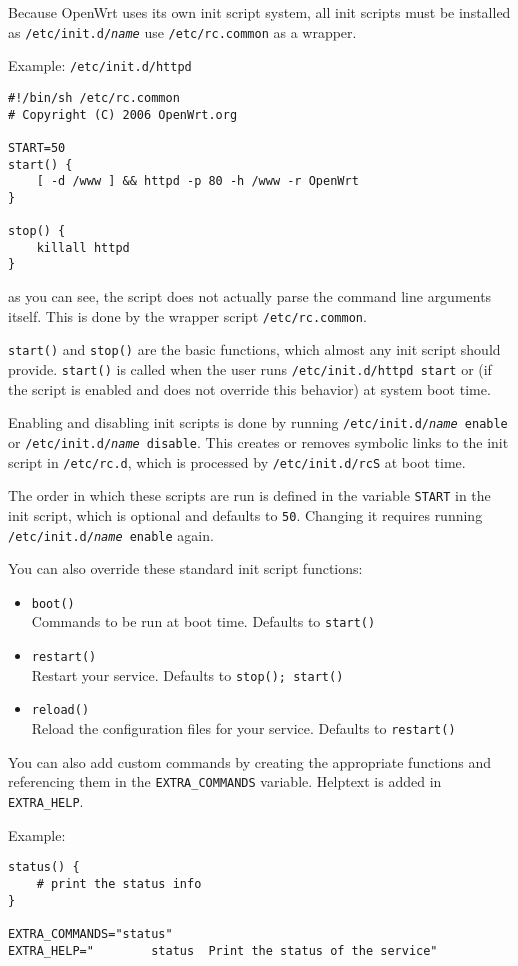 Because OpenWrt uses its own init script system, all init scripts must be installed
as \texttt{/etc/init.d/\textit{name}} use \texttt{/etc/rc.common} as a wrapper.

Example: \texttt{/etc/init.d/httpd}

\begin{Verbatim}
#!/bin/sh /etc/rc.common
# Copyright (C) 2006 OpenWrt.org

START=50
start() {
    [ -d /www ] && httpd -p 80 -h /www -r OpenWrt
}

stop() {
    killall httpd
}
\end{Verbatim}

as you can see, the script does not actually parse the command line arguments itself.
This is done by the wrapper script \texttt{/etc/rc.common}.

\texttt{start()} and \texttt{stop()} are the basic functions, which almost any init
script should provide. \texttt{start()} is called when the user runs \texttt{/etc/init.d/httpd start}
or (if the script is enabled and does not override this behavior) at system boot time.

Enabling and disabling init scripts is done by running \texttt{/etc/init.d/\textit{name} enable}
or \texttt{/etc/init.d/\textit{name} disable}. This creates or removes symbolic links to the
init script in \texttt{/etc/rc.d}, which is processed by \texttt{/etc/init.d/rcS} at boot time.

The order in which these scripts are run is defined in the variable \texttt{START} in the init
script, which is optional and defaults to \texttt{50}. Changing it requires running
\texttt{/etc/init.d/\textit{name} enable} again.

You can also override these standard init script functions:
\begin{itemize}
    \item \texttt{boot()} \\
        Commands to be run at boot time. Defaults to \texttt{start()}

    \item \texttt{restart()} \\
        Restart your service. Defaults to \texttt{stop(); start()}

    \item \texttt{reload()} \\
        Reload the configuration files for your service. Defaults to \texttt{restart()}

\end{itemize}

You can also add custom commands by creating the appropriate functions and referencing them
in the \texttt{EXTRA\_COMMANDS} variable. Helptext is added in \texttt{EXTRA\_HELP}.

Example:

\begin{Verbatim}
status() {
    # print the status info
}

EXTRA_COMMANDS="status"
EXTRA_HELP="        status  Print the status of the service"
\end{Verbatim}

